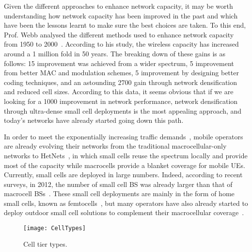 \documentclass{IEEEtran}
\begin{document}
Given the different approaches to enhance network capacity,
it may be worth understanding how network capacity has been improved in the past and which have been the lessons learnt
to make sure the best choices are taken.
To this end, Prof. Webb analysed the different methods used to enhance network capacity from 1950 to 2000~\cite{Webb2007}.
According to his study, the wireless capacity has increased around a 1 million fold in 50 years.
The breaking down of these gains is as follows:
15 improvement was achieved from a wider spectrum,
5 improvement from better \ac{MAC} and modulation schemes,
5 improvement by designing better coding techniques,
and an astounding  2700 gain through network densification and reduced cell sizes.
According to this data,
it seems obvious that if we are looking for a 1000 improvement in network performance,
network densification through ultra-dense small cell deployments is the most appealing approach,
and today's networks have already started going down this path.

In order to meet the exponentially increasing traffic demands~\cite{Cisco_TrafficUpdate_2015},
mobile operators are already evolving their networks from the traditional macrocellular-only networks to \acp{HetNet}~\cite{5876496, Lopez_perez2011HetNet},
in which small cells reuse the spectrum locally and provide most of the capacity
while macrocells provide a blanket coverage for mobile \acp{UE}.
Currently, small cells are deployed in large numbers.
Indeed, according to recent surveys, in 2012,
the number of small cell \ac{BS} was already larger than that of macrocell \acp{BS}~\cite{SmallCellForum2012}.
These small cell deployments are mainly in the form of home small cells,
known as femtocells~\cite{Chandrasekhar2008a, Claussen:08a, Lopez-Perez2009a},
but many operators have also already started to deploy outdoor small cell solutions to complement their macrocellular coverage~\cite{6166483}.

\begin{figure*}[t!]
  \centering
	\texttt{[image: CellTypes]}
  	\caption{Cell tier types.}
  	\label{fig:cell_tier_types}
\end{figure*}
\end{document}
